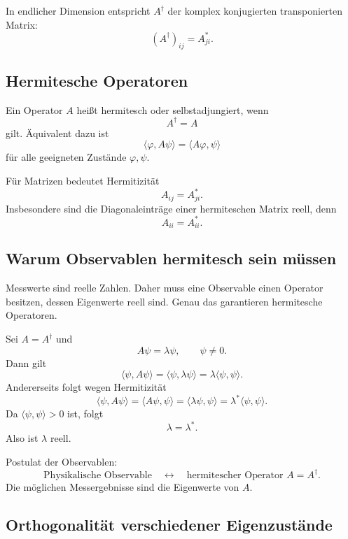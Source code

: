 In endlicher Dimension entspricht $A^\dagger$ der komplex konjugierten transponierten Matrix:
\[
    (A^\dagger)_{ij}=A_{ji}^*.
\]

\subsection{Hermitesche Operatoren}

\begin{definitionbox}
Ein Operator $A$ heißt hermitesch oder selbstadjungiert, wenn
\[
    A^\dagger=A
\]
gilt. Äquivalent dazu ist
\[
    \langle \varphi,A\psi\rangle=\langle A\varphi,\psi\rangle
\]
für alle geeigneten Zustände $\varphi,\psi$.
\end{definitionbox}

Für Matrizen bedeutet Hermitizität
\[
    A_{ij}=A_{ji}^*.
\]
Insbesondere sind die Diagonaleinträge einer hermiteschen Matrix reell, denn
\[
    A_{ii}=A_{ii}^*.
\]

\subsection{Warum Observablen hermitesch sein müssen}

Messwerte sind reelle Zahlen. Daher muss eine Observable einen Operator besitzen, dessen Eigenwerte reell sind. Genau das garantieren hermitesche Operatoren.

\begin{derivationbox}
Sei $A=A^\dagger$ und
\[
    A\psi=\lambda\psi,
    \qquad \psi\ne0.
\]
Dann gilt
\[
    \langle \psi,A\psi\rangle
    =\langle \psi,\lambda\psi\rangle
    =\lambda\langle \psi,
    \psi\rangle.
\]
Andererseits folgt wegen Hermitizität
\[
    \langle \psi,A\psi\rangle
    =\langle A\psi,\psi\rangle
    =\langle \lambda\psi,\psi\rangle
    =\lambda^*\langle \psi,\psi\rangle.
\]
Da $\langle\psi,\psi\rangle>0$ ist, folgt
\[
    \lambda=\lambda^*.
\]
Also ist $\lambda$ reell.
\end{derivationbox}

\begin{formulabox}
Postulat der Observablen:
\[
    \text{Physikalische Observable} \quad \longleftrightarrow \quad \text{hermitescher Operator } A=A^\dagger.
\]
Die möglichen Messergebnisse sind die Eigenwerte von $A$.
\end{formulabox}

\subsection{Orthogonalität verschiedener Eigenzustände}

